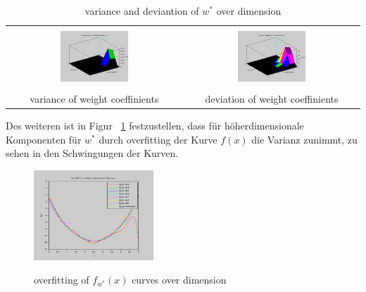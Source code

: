 \documentclass[]{report}
\begin{document}
\begin{table}[h]
\begin{tabular}{| c | c |}
\hline
 & \\
\includegraphics[width=0.4\textwidth]{./images/VarianceWeightCoeffinientsOverDimension.png} & \includegraphics[width=0.4\textwidth]{./images/DeviationWeightCoeffinientsOverDimension.png} \\
 & \\
variance of weight coeffinients & deviation of weight coeffinients \\
\hline
\end{tabular}
\caption{variance and deviantion of $w^*$ over dimension}
\label{tab:VarianceAndDeviantion}
\end{table}

Des weiteren ist in Figur ~\ref{tab:Overfitting} festzustellen, dass f\"ur h\"oherdimensionale Komponenten f\"ur $w^*$ durch overfitting der Kurve $f(x)$ die Varianz zunimmt, zu sehen in den Schwingungen der Kurven.

\begin{figure}[h]
\centering
\includegraphics[width=0.4\textwidth]{./images/f_x_w_star_overDimensions.png} \\
\caption{overfitting of $f_{w^*}(x)$ curves over dimension}
\label{tab:Overfitting}
\end{figure}
\end{document}

